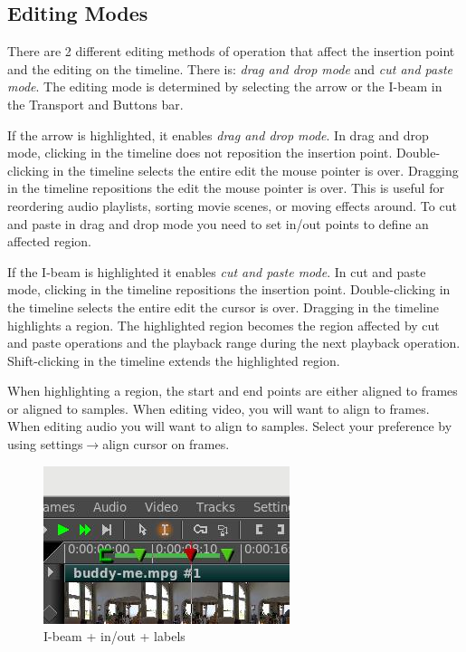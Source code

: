 \subsection{Editing Modes}%
\label{sub:editing_modes}

There are 2 different editing methods of operation that affect the insertion point and the editing on the timeline.  
There is:  \emph{drag and drop mode} and \emph{cut and paste mode}. 
The editing mode is determined by selecting the arrow or the I-beam in the Transport and Buttons bar. 

If the arrow is highlighted, it enables \emph{drag and drop mode}.  
In drag and drop mode, clicking in the timeline does not reposition the insertion point.  
Double-clicking in the timeline selects the entire edit the mouse pointer is over.  
Dragging in the timeline repositions the edit the mouse pointer is over. 
This is useful for reordering audio playlists, sorting movie scenes, or moving effects around. 
To cut and paste in drag and drop mode you need to set in/out points to define an affected region. 

If the I-beam is highlighted it enables \emph{cut and paste mode}. 
In cut and paste mode, clicking in the timeline repositions the insertion point. 
Double-clicking in the timeline selects the entire edit the cursor is over. 
Dragging in the timeline highlights a region. 
The highlighted region becomes the region affected by cut and paste operations and the playback range during the next playback operation. 
Shift-clicking in the timeline extends the highlighted region.

When highlighting a region, the start and end points are either aligned to frames or aligned to samples. When editing video, you will want to align to frames. When editing audio you will want to align to samples. Select your preference by using settings$\rightarrow$align cursor on frames.

\begin{figure}[htpb]
    \centering
    \includegraphics[width=0.4\linewidth]{images/i-beam.png}
    \caption{I-beam + in/out  +  labels}
    \label{fig:i-beam}
\end{figure}

